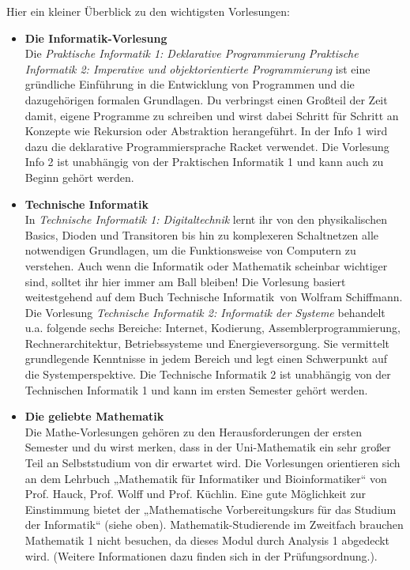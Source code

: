 \ifbachelor
{}
Hier ein kleiner Überblick zu den wichtigsten Vorlesungen:
\begin{itemize}
	\item
	\textbf{Die Informatik-Vorlesung} \\
	Die
	\ifwintersemester \emph{Praktische Informatik 1: Deklarative Programmierung} \fi
	\ifsommersemester \emph{Praktische Informatik 2: Imperative und objektorientierte Programmierung} \fi
	ist eine gründliche Einführung in die Entwicklung von Programmen und die dazugehörigen formalen Grundlagen.
	Du verbringst einen Großteil der Zeit damit, eigene Programme zu schreiben und wirst dabei Schritt für Schritt
	an Konzepte wie Rekursion oder Abstraktion herangeführt.
	\ifwintersemester In der Info 1 wird dazu die deklarative Programmiersprache Racket verwendet. \fi
	\ifsommersemester Die Vorlesung Info 2 ist unabhängig von der Praktischen Informatik 1 und kann auch zu Beginn gehört werden. \fi

	\ifinfo
	\item
	\textbf{Technische Informatik} \\
	\ifwintersemester
	In \emph{Technische Informatik 1: Digitaltechnik} lernt ihr von den physikalischen Basics, Dioden und Transitoren bis hin zu komplexeren Schaltnetzen alle notwendigen Grundlagen,
	um die Funktionsweise von Computern zu verstehen. Auch wenn die Informatik oder Mathematik scheinbar wichtiger sind, solltet ihr hier immer am Ball bleiben!
	Die Vorlesung basiert weitestgehend auf dem Buch \glqq Technische Informatik\grqq \ von Wolfram Schiffmann.
	\fi
	\ifsommersemester
	Die Vorlesung \emph{Technische Informatik 2: Informatik der Systeme} behandelt u.a. folgende sechs Bereiche: Internet, Kodierung, Assemblerprogrammierung, Rechnerarchitektur, Betriebssysteme
	und Energieversorgung. Sie vermittelt grundlegende Kenntnisse in jedem Bereich und legt einen Schwerpunkt auf die Systemperspektive. Die Technische Informatik 2 ist unabhängig von
	der Technischen Informatik 1 und kann im ersten Semester gehört werden.
	\fi
	\fi

	\item
	\textbf{Die geliebte Mathematik} \\
	Die Mathe-Vorlesungen gehören zu den Herausforderungen der ersten Semester und du wirst merken, dass in der Uni-Mathematik ein sehr großer Teil an Selbststudium von dir erwartet wird.
	Die Vorlesungen orientieren sich an dem Lehrbuch „Mathematik für Informatiker und Bioinformatiker“ von Prof. Hauck, Prof. Wolff und Prof. Küchlin. Eine gute Möglichkeit zur
	Einstimmung bietet der „Mathematische Vorbereitungskurs für das Studium der Informatik“ (siehe oben).
	\iflehramt
	Mathematik-Studierende im Zweitfach brauchen Mathematik 1 nicht besuchen, da dieses Modul durch Analysis 1 abgedeckt wird. 
	(Weitere Informationen dazu finden sich in der Prüfungsordnung.).
	\fi
\end{itemize}
\fi
